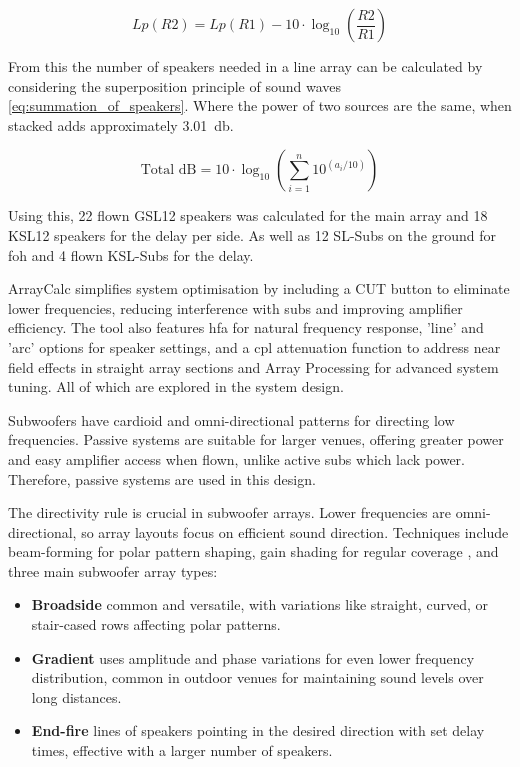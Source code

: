     \begin{equation}\label{eq:modified_inverse_square_law}
        Lp(R2) = Lp(R1) - 10 \cdot \log_{10}\left(\frac{R2}{R1}\right)
    \end{equation}

    From this the number of speakers needed in a line array can be calculated by considering the superposition principle of sound waves \eqref{eq:summation_of_speakers}. Where the power of two sources are the same, when stacked adds approximately \SI{3.01}{\decibel}.

    \begin{equation}\label{eq:summation_of_speakers}
        \text{Total dB} = 10 \cdot \log_{10}\left(\sum_{i=1}^{n} 10^{(a_i/10)}\right)
    \end{equation}

    Using this, 22 flown GSL12 speakers was calculated for the main array and 18 KSL12 speakers for the delay per side. As well as 12 SL-Subs on the ground for \acrshort{foh} and 4 flown KSL-Subs for the delay.
    
    ArrayCalc simplifies system optimisation by including a CUT button to eliminate lower frequencies, reducing interference with subs and improving amplifier efficiency. The tool also features \acrfull{hfa} for natural frequency response, 'line' and 'arc' options for speaker settings, and a \acrfull{cpl} attenuation function to address near field effects in straight array sections and Array Processing for advanced system tuning. All of which are explored in the system design.

    Subwoofers have cardioid and omni-directional patterns for directing low frequencies. Passive systems are suitable for larger venues, offering greater power and easy amplifier access when flown, unlike active subs which lack power. Therefore, passive systems are used in this design.

    The directivity rule is crucial in subwoofer arrays. Lower frequencies are omni-directional, so array layouts focus on efficient sound direction.
    Techniques include beam-forming for polar pattern shaping, gain shading for regular coverage \citep{jberryman2010}, and three main subwoofer array types: 
    
    \begin{itemize}
        \item \textbf{Broadside} common and versatile, with variations like straight, curved, or stair-cased rows affecting polar patterns.
        \item \textbf{Gradient} uses amplitude and phase variations for even lower frequency distribution, common in outdoor venues for maintaining sound levels over long distances.
        \item \textbf{End-fire} lines of speakers pointing in the desired direction with set delay times, effective with a larger number of speakers.
    \end{itemize}

